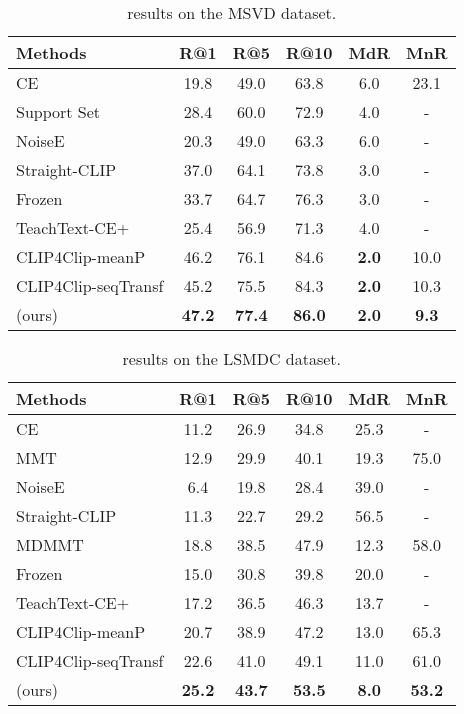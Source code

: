 \documentclass[10pt,twocolumn,letterpaper]{article}
\begin{document}
\begin{table}[]
\footnotesize
\setlength{\tabcolsep}{2pt}
\centering
\begin{tabular}{l c c c c c} 
\hline 
Methods & R@1  & R@5  & R@10  & MdR  & MnR  \\
\hline
CE \cite{liu2019use} & 19.8 & 49.0 & 63.8 & 6.0 & 23.1 \\
Support Set \cite{patrick2020support} & 28.4 & 60.0 & 72.9 & 4.0 & - \\
NoiseE \cite{amrani2020noise} & 20.3 & 49.0 & 63.3 & 6.0 & - \\
Straight-CLIP \cite{portillo2021straightforward} & 37.0 & 64.1 & 73.8 & 3.0 & - \\
Frozen \cite{bain2021frozen} & 33.7 & 64.7 & 76.3 & 3.0 & - \\
TeachText-CE+ \cite{croitoru2021teachtext} & 25.4 & 56.9 & 71.3 & 4.0 & - \\ 
CLIP4Clip-meanP \cite{luo2021clip4clip} & 46.2 & 76.1 & 84.6 & \textbf{2.0} & 10.0 \\
CLIP4Clip-seqTransf \cite{luo2021clip4clip} & 45.2 & 75.5 & 84.3 & \textbf{2.0} & 10.3 \\
\ModelName{} (ours) & \textbf{47.2} & \textbf{77.4} & \textbf{86.0} & \textbf{2.0} & \textbf{9.3} \\
\hline
\end{tabular}
\vspace{-0.2cm}
\caption{ results on the MSVD dataset.}
\label{tab:msvd-res}
\end{table}

\begin{table}[]
\footnotesize
\setlength{\tabcolsep}{2pt}
\centering
\begin{tabular}{l c c c c c} 
\hline 
Methods & R@1  & R@5  & R@10  & MdR  & MnR  \\
\hline
CE \cite{liu2019use} & 11.2 & 26.9 & 34.8 & 25.3 & - \\
MMT \cite{gabeur2020multi} & 12.9 & 29.9 & 40.1 & 19.3 & 75.0 \\
NoiseE \cite{amrani2020noise} & 6.4 & 19.8 & 28.4 & 39.0 & - \\
Straight-CLIP \cite{portillo2021straightforward} & 11.3 & 22.7 & 29.2 & 56.5 & - \\
MDMMT \cite{dzabraev2021mdmmt} & 18.8 & 38.5 & 47.9 & 12.3 & 58.0 \\
Frozen \cite{bain2021frozen} & 15.0 & 30.8 & 39.8 & 20.0 & - \\
TeachText-CE+ \cite{croitoru2021teachtext} & 17.2 & 36.5 & 46.3 & 13.7 & - \\
CLIP4Clip-meanP \cite{luo2021clip4clip} & 20.7 & 38.9 & 47.2 & 13.0 & 65.3 \\
CLIP4Clip-seqTransf \cite{luo2021clip4clip} & 22.6 & 41.0 & 49.1 & 11.0 & 61.0 \\
\ModelName{} (ours) & \textbf{25.2} & \textbf{43.7} & \textbf{53.5} & \textbf{8.0} & \textbf{53.2} \\
\hline
\end{tabular}
\vspace{-0.2cm}
\caption{ results on the LSMDC dataset.}
\label{tab:lsmdc-res}
\end{table}
\end{document}
